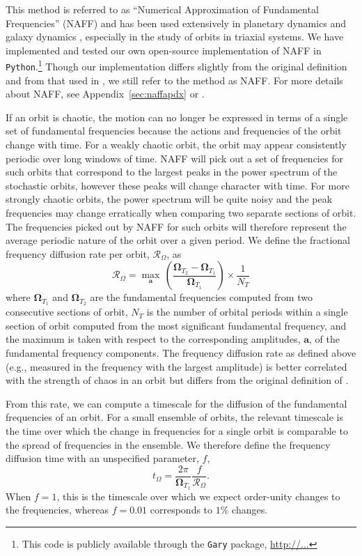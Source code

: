 \documentclass[letterpaper,12pt,preprint]{aastex}
\newcommand{\bs}[1]{\boldsymbol{#1}}
\newcommand{\fdrate}{\mathcal{R}_\Omega}
\begin{document}
This method is referred to as ``Numerical Approximation of Fundamental Frequencies'' (NAFF) and has been used extensively in planetary dynamics \citep{} and galaxy dynamics \citep{valluri98}, especially in the study of orbits in triaxial systems. We have implemented and tested our own open-source implementation of NAFF in \texttt{Python}.\footnote{This code is publicly available through the \texttt{Gary} package, \url{http://...}} Though our implementation differs slightly from the original definition and from that used in \cite{valluri98}, we still refer to the method as NAFF. For more details about NAFF, see Appendix~\ref{sec:naffapdx} or \cite{papaphilippou96, laskar, etc.}.

If an orbit is chaotic, the motion can no longer be expressed in terms of a single set of fundamental frequencies because the actions and frequencies of the orbit change with time. For a weakly chaotic orbit, the orbit may appear consistently periodic over long windows of time. NAFF will pick out a set of frequencies for such orbits that correspond to the largest peaks in the power spectrum of the stochastic orbits, however these peaks will change character with time. For more strongly chaotic orbits, the power spectrum will be quite noisy and the peak frequencies may change erratically when comparing two separate sections of orbit. The frequencies picked out by NAFF for such orbits will therefore represent the average periodic nature of the orbit over a given period. We define the fractional frequency diffusion rate per orbit, $\fdrate$, as
\begin{equation}
	\fdrate = \max_{\bs{a}} \, \left(\frac{\bs{\Omega}_{T_2} - \bs{\Omega}_{T_1}}{\bs{\Omega}_{T_1}}\right) \times \frac{1}{N_T}\label{eq:fdrate}
\end{equation}
where $\bs{\Omega}_{T_1}$ and $\bs{\Omega}_{T_2}$ are the fundamental frequencies computed from two consecutive sections of orbit, $N_T$ is the number of orbital periods within a single section of orbit computed from the most significant fundamental frequency, and the maximum is taken with respect to the corresponding amplitudes, $\bs{a}$, of the fundamental frequency components. The frequency diffusion rate as defined above (e.g., measured in the frequency with the largest amplitude) is better correlated with the strength of chaos in an orbit \citep{valluri??} but differs from the original definition of \cite{valluri98}.

From this rate, we can compute a timescale for the diffusion of the fundamental frequencies of an orbit. For a small ensemble of orbits, the relevant timescale is the time over which the change in frequencies for a single orbit is comparable to the spread of frequencies in the ensemble. We therefore define the frequency diffusion time with an unspecified parameter, $f$,
\begin{equation}
	t_\Omega = \frac{2 \pi}{\bs{\Omega}_{T_1}} \frac{f}{\fdrate}.
\end{equation}
When $f = 1$, this is the timescale over which we expect order-unity changes to the frequencies, whereas $f = 0.01$ corresponds to $1\%$ changes.
\end{document}
